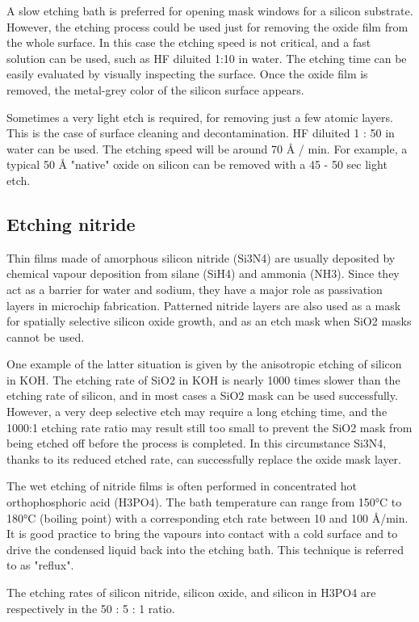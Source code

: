 A slow etching bath is preferred for opening mask windows for a silicon substrate. However, the etching process could be used just for removing the oxide film from the whole surface. In this case the etching speed is not critical, and a fast solution can be used, such as HF diluited 1:10 in water. The etching time can be easily evaluated by visually inspecting the surface. Once the oxide film is removed, the metal-grey color of the silicon surface appears.

Sometimes a very light etch is required, for removing just a few atomic layers. This is the case of surface cleaning and decontamination. HF diluited 1 : 50 in water can be used. The etching speed will be around 70 Å / min. For example, a typical 50 Å "native" oxide on silicon can be removed with a 45 - 50 sec light etch.

\newpage

\subsection{Etching nitride}
Thin films made of amorphous silicon nitride (Si3N4) are usually deposited by chemical vapour deposition from silane (SiH4) and ammonia (NH3).
Since they act as a barrier for water and sodium, they have a major role as passivation layers in microchip fabrication.
Patterned nitride layers are also used as a mask for spatially selective silicon oxide growth, and as an etch mask when SiO2 masks cannot be used.

One example of the latter situation is given by the anisotropic etching of silicon in KOH.
The etching rate of SiO2 in KOH is nearly 1000 times slower than the etching rate of silicon, and in most cases a SiO2 mask can be used successfully.
However, a very deep selective etch may require a long etching time, and the 1000:1 etching rate ratio may result still too small to prevent the SiO2 mask from being etched off before the process is completed.
In this circumstance Si3N4, thanks to its reduced etched rate, can successfully replace the oxide mask layer.

The wet etching of nitride films is often performed in concentrated hot orthophosphoric acid (H3PO4).
The bath temperature can range from 150°C to 180°C (boiling point) with a corresponding etch rate between 10 and 100 Å/min.
It is good practice to bring the vapours into contact with a cold surface and to drive the condensed liquid back into the etching bath.
This technique is referred to as "reflux".

The etching rates of silicon nitride, silicon oxide, and silicon in H3PO4 are respectively in the 50 : 5 : 1 ratio.